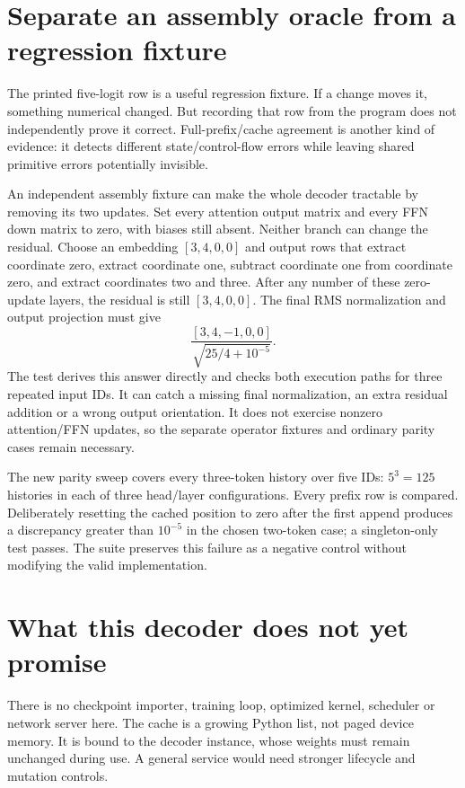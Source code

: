 \section{Separate an assembly oracle from a regression fixture}
The printed five-logit row is a useful regression fixture. If a change
moves it, something numerical changed. But recording that row from the
program does not independently prove it correct.
Full-prefix/cache agreement is another kind of evidence: it detects
different state/control-flow errors while leaving shared primitive errors
potentially invisible.

An independent assembly fixture can make the whole decoder tractable by
removing its two updates. Set every attention output matrix and every
FFN down matrix to zero, with biases still absent. Neither branch can
change the residual. Choose an embedding $[3,4,0,0]$ and output rows
that extract coordinate zero, extract coordinate one, subtract coordinate
one from coordinate zero, and extract coordinates two and three.
After any number of these zero-update layers, the residual is still
$[3,4,0,0]$. The final RMS normalization and output projection must give
\[
 \frac{[3,4,-1,0,0]}{\sqrt{25/4+10^{-5}}}.
\]
The test derives this answer directly and checks both execution paths
for three repeated input IDs. It can catch a missing final normalization,
an extra residual addition or a wrong output orientation. It does not
exercise nonzero attention/FFN updates, so the separate operator fixtures
and ordinary parity cases remain necessary.

The new parity sweep covers every three-token history over five IDs:
$5^3=125$ histories in each of three head/layer configurations.
Every prefix row is compared. Deliberately resetting the cached position
to zero after the first append produces a discrepancy greater than
$10^{-5}$ in the chosen two-token case; a singleton-only test passes.
The suite preserves this failure as a negative control without modifying
the valid implementation.

\section{What this decoder does not yet promise}
There is no checkpoint importer, training loop, optimized kernel,
scheduler or network server here. The cache is a growing Python list,
not paged device memory. It is bound to the decoder instance, whose
weights must remain unchanged during use. A general service would
need stronger lifecycle and mutation controls.

